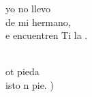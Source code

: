 \begin{cancion}
	 yo no llevo\\
	 de mi hermano,\\
	e encuentren Ti la .  \\\jump\\
	\begin{chorus}%
	ot pieda\\
	isto n pie. )\\
	\end{chorus}%
	\jump\\
\end{cancion}%
